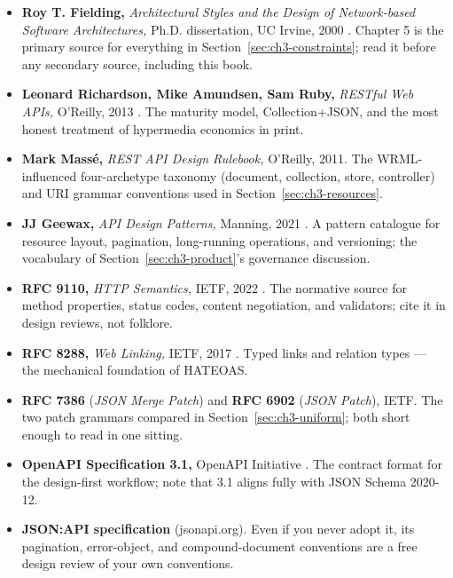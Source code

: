 \begin{itemize}
  \item \textbf{Roy T. Fielding,} \emph{Architectural Styles and the Design of
        Network-based Software Architectures,} Ph.D. dissertation, UC Irvine,
        2000 \cite{fielding2000rest}. Chapter 5 is the primary source for
        everything in Section~\ref{sec:ch3-constraints}; read it before any
        secondary source, including this book.
  \item \textbf{Leonard Richardson, Mike Amundsen, Sam Ruby,}
        \emph{RESTful Web APIs,} O'Reilly, 2013 \cite{richardson2013restful}.
        The maturity model, Collection+JSON, and the most honest treatment of
        hypermedia economics in print.
  \item \textbf{Mark Mass\'e,} \emph{REST API Design Rulebook,} O'Reilly, 2011.
        The WRML-influenced four-archetype taxonomy (document, collection,
        store, controller) and URI grammar conventions used in
        Section~\ref{sec:ch3-resources}.
  \item \textbf{JJ Geewax,} \emph{API Design Patterns,} Manning, 2021
        \cite{gehl2021apidesign}. A pattern catalogue for resource layout,
        pagination, long-running operations, and versioning; the vocabulary of
        Section~\ref{sec:ch3-product}'s governance discussion.
  \item \textbf{RFC 9110,} \emph{HTTP Semantics,} IETF, 2022 \cite{rfc9110}.
        The normative source for method properties, status codes, content
        negotiation, and validators; cite it in design reviews, not folklore.
  \item \textbf{RFC 8288,} \emph{Web Linking,} IETF, 2017 \cite{rfc8288}. Typed
        links and relation types --- the mechanical foundation of HATEOAS.
  \item \textbf{RFC 7386} (\emph{JSON Merge Patch}) and \textbf{RFC 6902}
        (\emph{JSON Patch}), IETF. The two patch grammars compared in
        Section~\ref{sec:ch3-uniform}; both short enough to read in one
        sitting.
  \item \textbf{OpenAPI Specification 3.1,} OpenAPI Initiative
        \cite{openapi31}. The contract format for the design-first workflow;
        note that 3.1 aligns fully with JSON Schema 2020-12.
  \item \textbf{JSON:API specification} (jsonapi.org). Even if you never adopt
        it, its pagination, error-object, and compound-document conventions are
        a free design review of your own conventions.

\end{itemize}
